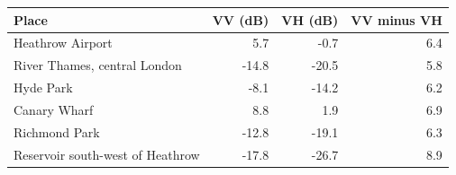 \begin{tabular}{lrrr}
\toprule
Place & VV (dB) & VH (dB) & VV minus VH \\
\midrule
Heathrow Airport & 5.7 & -0.7 & 6.4 \\
River Thames, central London & -14.8 & -20.5 & 5.8 \\
Hyde Park & -8.1 & -14.2 & 6.2 \\
Canary Wharf & 8.8 & 1.9 & 6.9 \\
Richmond Park & -12.8 & -19.1 & 6.3 \\
Reservoir south-west of Heathrow & -17.8 & -26.7 & 8.9 \\
\bottomrule
\end{tabular}

